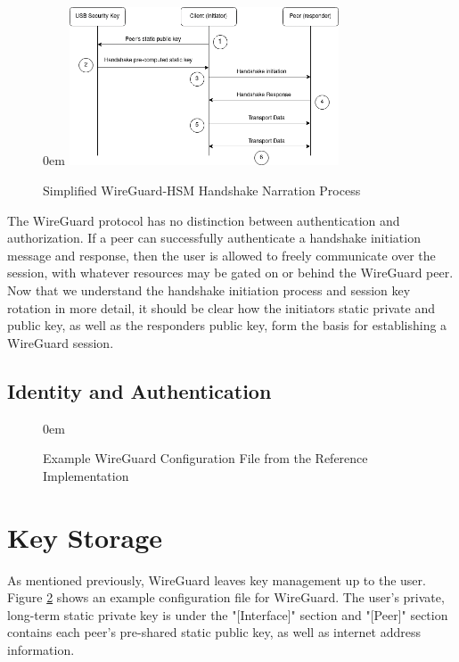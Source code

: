 \documentclass [11pt, proquest] {uwthesis}[2020/02/24]
\begin{document}
\begin{figure}
\itemsep0em 
\includegraphics[width=8cm]{paper/images/Process_Diagram.png}
\caption{Simplified WireGuard-HSM Handshake Narration Process}
\label{fig:handshake_process}
\end{figure}
The WireGuard protocol has no distinction between authentication and authorization. If a peer can successfully authenticate a handshake initiation message and response, then the user is allowed to freely communicate over the session, with whatever resources may be gated on or behind the WireGuard peer.
Now that we understand the handshake initiation process and session key rotation in more detail, it should be clear how the initiators static private and public key, as well as the responders public key, form the basis for establishing a WireGuard session.


\subsection {Identity and Authentication}
\label{identity}

\begin{figure}
\itemsep0em 
\caption{Example WireGuard Configuration File from the Reference Implementation}
\label{fig:wg_config}
\end{figure}

\section{Key Storage}
As mentioned previously, WireGuard leaves key management up to the user.
Figure \ref{fig:wg_config} shows an example configuration file for WireGuard. The user's private, long-term static private key is under the "[Interface]" section and "[Peer]" section contains each peer's pre-shared static public key, as well as internet address information.
\end{document}
